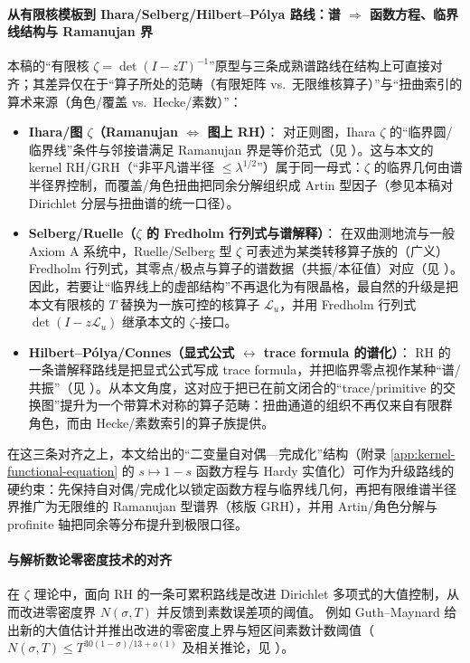 \paragraph{从有限核模板到 Ihara/Selberg/Hilbert--P{\'o}lya 路线：谱 \texorpdfstring{$\Rightarrow$}{=>} 函数方程、临界线结构与 Ramanujan 界}
本稿的“有限核 \(\zeta=\det(I-zT)^{-1}\)”原型与三条成熟谱路线在结构上可直接对齐；其差异仅在于“算子所处的范畴（有限矩阵 vs.\ 无限维核算子）”与“扭曲索引的算术来源（角色/覆盖 vs.\ Hecke/素数）”：
\begin{itemize}
  \item \textbf{Ihara/图 \(\zeta\)（Ramanujan \(\Leftrightarrow\) 图上 RH）}：
  对正则图，Ihara \(\zeta\) 的“临界圆/临界线”条件与邻接谱满足 Ramanujan 界是等价范式（见 \cite{TerrasZetaGraphs,StarkTerras1996GraphCoverings}）。这与本文的 kernel RH/GRH（“非平凡谱半径 \(\le \lambda^{1/2}\)”）属于同一母式：\(\zeta\) 的临界几何由谱半径界控制，而覆盖/角色扭曲把同余分解组织成 Artin 型因子（参见本稿对 Dirichlet 分层与扭曲谱的统一口径）。
  \item \textbf{Selberg/Ruelle（\(\zeta\) 的 Fredholm 行列式与谱解释）}：
  在双曲测地流与一般 Axiom A 系统中，Ruelle/Selberg 型 \(\zeta\) 可表述为某类转移算子族的（广义）Fredholm 行列式，其零点/极点与算子的谱数据（共振/本征值）对应（见 \cite{Ruelle1976ZetaExpanding,ParryPollicott1990Zeta,Fried1986RuelleSelberg}）。因此，若要让“临界线上的虚部结构”不再退化为有限晶格，最自然的升级是把本文有限核的 \(T\) 替换为一族可控的核算子 \(\mathcal{L}_u\)，并用 Fredholm 行列式 \(\det(I-z\mathcal{L}_u)\) 继承本文的 \(\zeta\)-接口。
  \item \textbf{Hilbert--P{\'o}lya/Connes（显式公式 \(\leftrightarrow\) trace formula 的谱化）}：
  RH 的一条谱解释路线是把显式公式写成 trace formula，并把临界零点视作某种“谱/共振”（见 \cite{Connes1999TraceFormulaNCG}）。从本文角度，这对应于把已在前文闭合的“trace/primitive 的交换图”提升为一个带算术对称的算子范畴：扭曲通道的组织不再仅来自有限群角色，而由 Hecke/素数索引的算子族提供。
\end{itemize}
在这三条对齐之上，本文给出的“二变量自对偶—完成化”结构（附录 \ref{app:kernel-functional-equation} 的 \(s\mapsto 1-s\) 函数方程与 Hardy 实值化）可作为升级路线的硬约束：先保持自对偶/完成化以锁定函数方程与临界线几何，再把有限维谱半径界推广为无限维的 Ramanujan 型谱界（核版 GRH），并用 Artin/角色分解与 profinite 轴把同余等分布提升到极限口径。

\paragraph{与解析数论零密度技术的对齐}
在 \(\zeta\) 理论中，面向 RH 的一条可累积路线是改进 Dirichlet 多项式的大值控制，从而改进零密度界 \(N(\sigma,T)\) 并反馈到素数误差项的阈值。
例如 Guth--Maynard 给出新的大值估计并推出改进的零密度上界与短区间素数计数阈值（\(N(\sigma,T)\le T^{30(1-\sigma)/13+o(1)}\) 及相关推论，见 \cite{GuthMaynard2024LargeValues}）。

